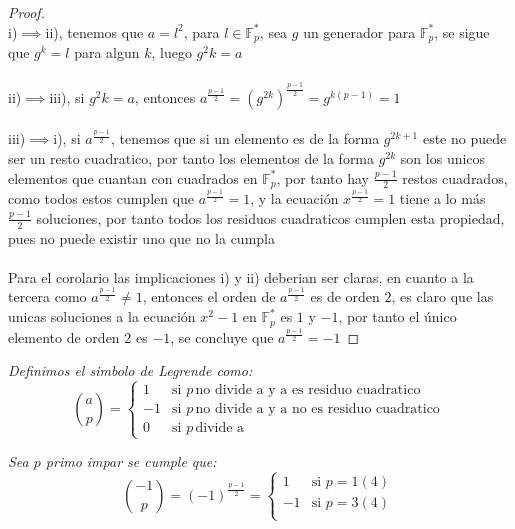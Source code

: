 \documentclass[11pt,letterpaper]{article}
\begin{document}
\begin{proof}\,\\
    i)$\implies$ii), tenemos que $a=l^2$, para $l\in \mathbb{F}_p^*$, sea $g$ un generador para $\mathbb{F}_p^*$, se sigue que $g^k=l$ para algun $k$, luego
    $g^2k=a$\,\\
    \,\\
    ii)$\implies$iii), si $g^2k=a$, entonces $a^{\frac{p-1}{2}}=(g^{2k})^{\frac{p-1}{2}}=g^{k(p-1)}=1$\,\\
    \,\\
    iii)$\implies$i), si $a^{\frac{p-1}{2}}$, tenemos que si un elemento es de la forma $g^{2k+1}$ este no puede ser un resto cuadratico, por tanto los elementos de la forma $g^{2k}$ son los unicos elementos que cuantan con cuadrados en $\mathbb{F}^*_p$, por tanto hay $\frac{p-1}{2}$ restos cuadrados, como todos estos cumplen que $a^{\frac{p-1}{2}}=1$, y la ecuaci\'on 
    $x^{\frac{p-1}{2}}=1$ tiene a lo m\'as $\frac{p-1}{2}$ soluciones, por tanto todos los residuos cuadraticos cumplen esta propiedad, pues no puede existir uno que no la cumpla
    \,\\
    \,\\
    Para el corolario las implicaciones i) y ii) deberian ser claras, en cuanto a la tercera como $a^{\frac{p-1}{2}}\neq 1$, entonces el orden de $a^{\frac{p-1}{2}}$ es de orden $2$, es claro que las unicas soluciones
    a la ecuaci\'on $x^2-1$ en $\mathbb{F}_p^*$ es $1$ y $-1$, por tanto el \'unico elemento de orden $2$ es $-1$, se concluye que $a^{\frac{p-1}{2}}=-1$
\end{proof}
\begin{tcolorbox}[  
    colback=CINVESTAV!10,   %
    colframe=CINVESTAV,     %
    title=\textcolor{white}{Simbolo Legrende}
]
\textit{Definimos el simbolo de Legrende como:\,\\
\begin{equation*}
    \binom{a}{p}=
    \begin{cases}
        1 &\text{si } p\,\text{no divide a y  a  es residuo cuadratico}\,\\
        -1& \text{si } p\,\text{no divide a y a no es residuo cuadratico}\,\\
        0 &\text{si } p\,\text{divide a}  
    \end{cases}
\end{equation*}}
\end{tcolorbox}
\begin{tcolorbox}[  
    colback=CINVESTAV!10,   %
    colframe=CINVESTAV,     %
    title=\textcolor{white}{Raices cuadraticas para $-1$}
]
\textit{Sea $p$ primo impar se cumple que:\,\\
\begin{equation*}
    \binom{-1}{p}=(-1)^{\frac{p-1}{2}}=
    \begin{cases}
        1 &\text{si } p=1(4)\,\\
        -1& \text{si } p=3(4)\,\\
    \end{cases}
\end{equation*}}
\end{tcolorbox}
\end{document}
